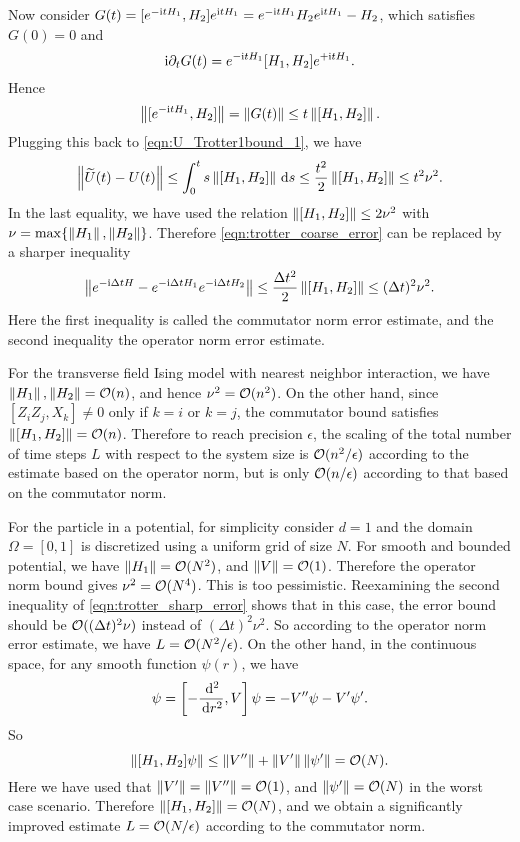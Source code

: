 Now consider $G(t)=[e^{-\mathrm{i} t H_1},H_2]e^{\mathrm{i} t H_1}=e^{-\mathrm{i} t H_1}H_2e^{\mathrm{i} t H_1}-H_2$, which satisfies $G(0)=0$ and 
\begin{equation}
\mathrm{i}\partial_t G(t)=e^{-\mathrm{i} t H_1}[H_1,H_2]e^{+\mathrm{i} t H_1}.
\end{equation}
Hence
\begin{equation}
\left\lVert[e^{-\mathrm{i} t H_1},H_2]\right\rVert=\left\lVert G(t)\right\rVert\le t\left\lVert[H_1,H_2]\right\rVert.
\end{equation}
Plugging this back to \cref{eqn:U_Trotter1bound_1}, we have
\begin{equation}
\left\lVert\widetilde{U}(t)-U(t)\right\rVert\le \int_0^t s\left\lVert[H_1,H_2]\right\rVert \,\mathrm{d} s\le \frac{t^2}{2}\left\lVert[H_1,H_2]\right\rVert\le t^2\nu^2.
\end{equation}
In the last equality, we have used the relation $\left\lVert[H_1,H_2]\right\rVert\le 2\nu^2$ with $\nu=\max\{\left\lVert H_1\right\rVert,\left\lVert H_2\right\rVert\}$.
Therefore \cref{eqn:trotter_coarse_error} can be replaced by a sharper inequality
\begin{equation}
\left\lVert e^{-\mathrm{i} \Delta t H}-e^{-\mathrm{i} \Delta t H_1}e^{-\mathrm{i} \Delta t H_2}\right\rVert\le \frac{\Delta t^2}{2}\left\lVert[H_1,H_2]\right\rVert\le (\Delta t)^2\nu^2.
\label{eqn:trotter_sharp_error}
\end{equation}
Here the first inequality is called the commutator norm error estimate, and the second inequality the operator norm error estimate.

For the transverse field Ising model with nearest neighbor interaction, we have $\left\lVert H_1\right\rVert,\left\lVert H_2\right\rVert=\mathcal{O}(n)$, and hence $\nu^2=\mathcal{O}(n^2)$.
On the other hand, since $[Z_iZ_j,X_k]\ne 0$ only if $k=i$ or $k=j$, the commutator bound satisfies $\left\lVert[H_1,H_2]\right\rVert=\mathcal{O}(n)$.
Therefore to reach precision $\epsilon$, the scaling of the total number of time steps $L$ with respect to the system size is $\mathcal{O}(n^2/\epsilon)$ according to the estimate based on the operator norm, but is only $\mathcal{O}(n/\epsilon)$ according to that based on the commutator norm.

For the particle in a potential, for simplicity consider $d=1$ and the domain $\Omega=[0,1]$ is discretized using a uniform grid of size $N$. 
For smooth and bounded potential, we have $\left\lVert H_1\right\rVert=\mathcal{O}(N^2)$, and $\left\lVert V\right\rVert=\mathcal{O}(1)$.
Therefore the operator norm bound gives $\nu^2=\mathcal{O}(N^4)$. 
This is too pessimistic. Reexamining the second inequality of \cref{eqn:trotter_sharp_error} shows that in this case, the error bound should be $\mathcal{O}((\Delta t)^2\nu)$ instead of $(\Delta t)^2\nu^2$. So according to the operator norm error estimate, we have $L=\mathcal{O}(N^2/\epsilon)$. 
On the other hand, in the continuous space, for any smooth function $\psi(r)$, we have
\begin{equation}
[H_1,H_2]\psi=\left[-\frac{\ud^2}{\ud r^2},V\right]\psi=-V''\psi-V'\psi'.
\end{equation}
So 
\begin{equation}
\left\lVert[H_1,H_2]\psi\right\rVert\le \left\lVert V''\right\rVert+\left\lVert V'\right\rVert\left\lVert\psi'\right\rVert=\mathcal{O}(N).
\end{equation}
Here we have used that $\left\lVert V'\right\rVert=\left\lVert V''\right\rVert=\mathcal{O}(1)$, and $\left\lVert\psi'\right\rVert=\mathcal{O}(N)$ in the worst case scenario.
Therefore $\left\lVert[H_1,H_2]\right\rVert=\mathcal{O}(N)$, and we obtain a significantly improved estimate $L=\mathcal{O}(N/\epsilon)$ according to the commutator norm.

